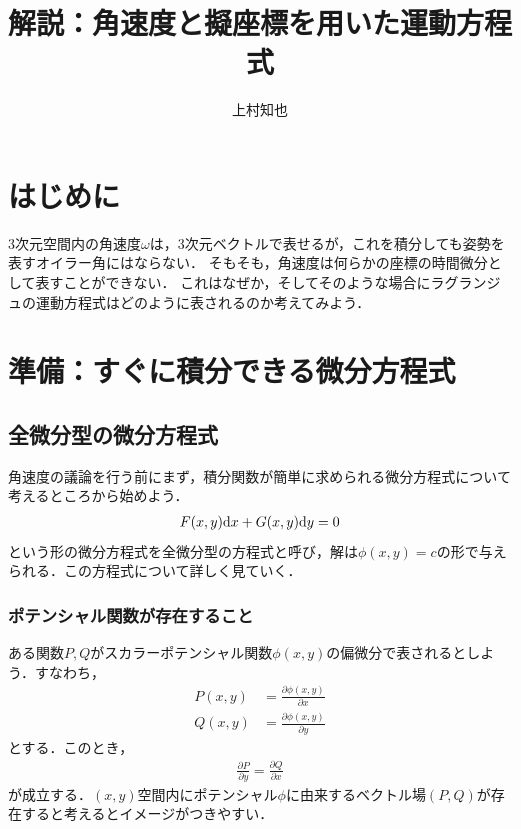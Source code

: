 \documentclass[a4j,10pt]{jsarticle}
\begin{document}
\title{解説：角速度と擬座標を用いた運動方程式}
\author{上村知也}
\setlength{\baselineskip}{3.8mm}	%
\maketitle
\section{はじめに}
3次元空間内の角速度$\omega$は，3次元ベクトルで表せるが，これを積分しても姿勢を表すオイラー角にはならない．
そもそも，角速度は何らかの座標の時間微分として表すことができない．
これはなぜか，そしてそのような場合にラグランジュの運動方程式はどのように表されるのか考えてみよう．

\section{準備：すぐに積分できる微分方程式}

\subsection{全微分型の微分方程式}

角速度の議論を行う前にまず，積分関数が簡単に求められる微分方程式について考えるところから始めよう．
\begin{align}
    F(x,y){\rm d} x + G(x,y){\rm d} y=0
    \label{eq:zenbibun}
\end{align}
という形の微分方程式を全微分型の方程式と呼び，解は$\phi(x,y) = c$の形で与えられる．この方程式について詳しく見ていく．

\subsubsection*{ポテンシャル関数が存在すること}
ある関数$P, Q$がスカラーポテンシャル関数$\phi(x,y)$の偏微分で表されるとしよう．すなわち，
\begin{subequations}
    \begin{align}
        P(x,y) &= \frac{\partial \phi(x,y)}{\partial x}\\
        Q(x,y) &= \frac{\partial \phi(x,y)}{\partial y}
    \end{align}
\end{subequations}
とする．このとき，
\begin{align}
    \frac{\partial P}{\partial y} = \frac{\partial Q}{\partial x}
\end{align}
が成立する．$(x,y)$空間内にポテンシャル$\phi$に由来するベクトル場$(P,Q)$が存在すると考えるとイメージがつきやすい．
\end{document}
